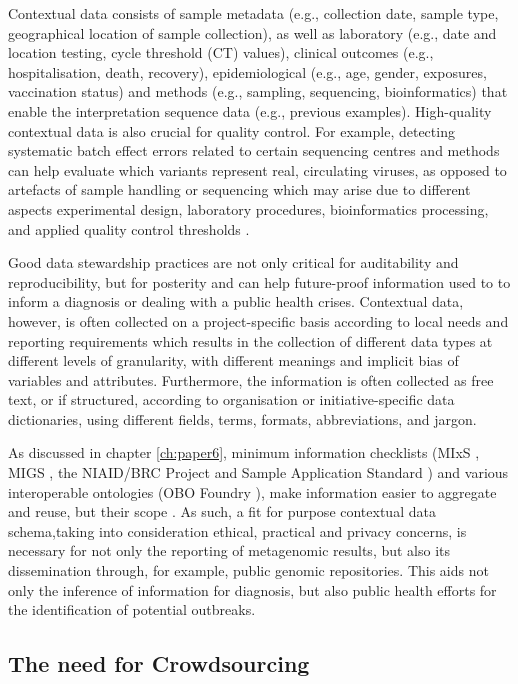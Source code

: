 Contextual data consists of sample metadata (e.g., collection date, sample type, geographical location of sample collection), as well as laboratory (e.g., date and location testing, cycle threshold (CT) values), clinical outcomes (e.g., hospitalisation, death, recovery), epidemiological (e.g., age, gender, exposures, vaccination status) and methods (e.g., sampling, sequencing, bioinformatics) that enable the interpretation sequence data (e.g., previous examples). High-quality contextual data is also crucial for quality control. For example, detecting systematic batch effect errors related to certain sequencing centres and methods can help evaluate which variants represent real, circulating viruses, as opposed to artefacts of sample handling or sequencing which may arise due to different aspects experimental design, laboratory procedures, bioinformatics processing, and applied quality control thresholds \cite{de_maio_issues_2020, rayko_quality_2020, poon_recurrent_2005}. 

Good data stewardship practices are not only critical for auditability and reproducibility, but for posterity and can help future-proof information used to to inform a diagnosis or dealing with a public health crises. Contextual data, however, is often collected on a project-specific basis according to local needs and reporting requirements which results in the collection of different data types at different levels of granularity, with different meanings and implicit bias of variables and attributes. Furthermore, the information is often collected as free text, or if structured, according to organisation or initiative-specific data dictionaries, using different fields, terms, formats, abbreviations, and jargon.

As discussed in chapter \ref{ch:paper6}, minimum information checklists (MIxS \cite{yilmaz_minimum_2011}, MIGS \cite{field_minimum_2008}, the NIAID/BRC Project and Sample Application Standard \cite{dugan_standardized_2014}) and various interoperable ontologies (OBO Foundry \cite{smith_obo_2007}), make information easier to aggregate and reuse, but their scope . As such, a fit for purpose contextual data schema,taking into consideration ethical, practical and privacy concerns, is necessary for not only the reporting of metagenomic results, but also its dissemination through, for example, public genomic repositories. This aids not only the inference of information for diagnosis, but also public health efforts for the identification of potential outbreaks.  

\subsection{The need for Crowdsourcing}

